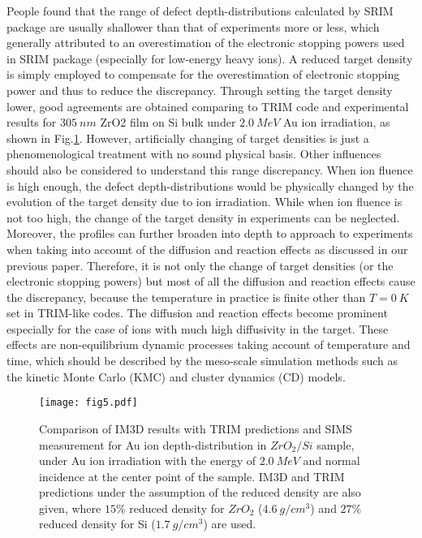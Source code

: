 People found that the range of defect depth-distributions calculated by SRIM package are usually shallower than that of experiments more or less, which generally attributed to an overestimation of the electronic stopping powers used in SRIM package (especially for low-energy heavy ions)\cite{Chang:2012,Zhang:2009,Paul:2013}. A reduced target density is simply employed to compensate for the overestimation of electronic stopping power and thus to reduce the discrepancy\cite{Chang:2012}. Through setting the target density lower, good agreements are obtained comparing to TRIM code and experimental results for $305~nm$ ZrO2 film on Si bulk under $2.0~MeV$ Au ion irradiation, as shown in Fig.\ref{Fig.5}. However, artificially changing of target densities is just a phenomenological treatment with no sound physical basis. Other influences should also be considered to understand this range discrepancy. When ion fluence is high enough, the defect depth-distributions would be physically changed by the evolution of the target density due to ion irradiation. While when ion fluence is not too high, the change of the target density in experiments can be neglected. Moreover, the profiles can further broaden into depth to approach to experiments when taking into account of the diffusion and reaction effects as discussed in our previous paper\cite{Li:2012}. Therefore, it is not only the change of target densities (or the electronic stopping powers) but most of all the diffusion and reaction effects cause the discrepancy, because the temperature in practice is finite other than $T=0~K$ set in TRIM-like codes. The diffusion and reaction effects become prominent especially for the case of ions with much high diffusivity in the target\cite{Li:2012}. These effects are non-equilibrium dynamic processes taking account of temperature and time, which should be described by the meso-scale simulation methods such as the kinetic Monte Carlo (KMC) and cluster dynamics (CD) models.

\begin{figure}[!ht]\centering
\texttt{[image: fig5.pdf]}
\caption{Comparison of IM3D results with TRIM predictions and SIMS measurement\cite{Chang:2012} for Au ion depth-distribution in $ZrO_2/Si$ sample, under Au ion irradiation with the energy of $2.0~MeV$ and normal incidence at the center point of the sample. IM3D and TRIM predictions under the assumption of the reduced density are also given, where $15\%$ reduced density for $ZrO_2$ ($4.6~g/cm^3$) and $27\%$reduced density for Si ($1.7~g/cm^3$) are used.} \label{Fig.5}
\end{figure}

